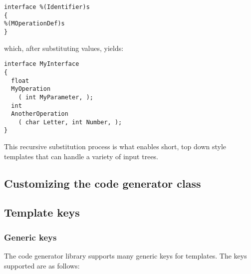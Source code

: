 \begin{verbatim}
interface %(Identifier)s
{
%(MOperationDef)s
}
\end{verbatim}
which, after substituting values, yields:
\begin{verbatim}
interface MyInterface
{
  float
  MyOperation
    ( int MyParameter, );
  int
  AnotherOperation
    ( char Letter, int Number, );
}
\end{verbatim}

This recursive substitution process is what enables short, top down style
templates that can handle a variety of input trees.

\subsection{Customizing the code generator class}
\label{subsection-template-component-generator}

\subsection{Template keys}
\label{subsection-template-keys}

\subsubsection{Generic keys}

The code generator library supports many generic keys for templates. The keys
supported are as follows:

